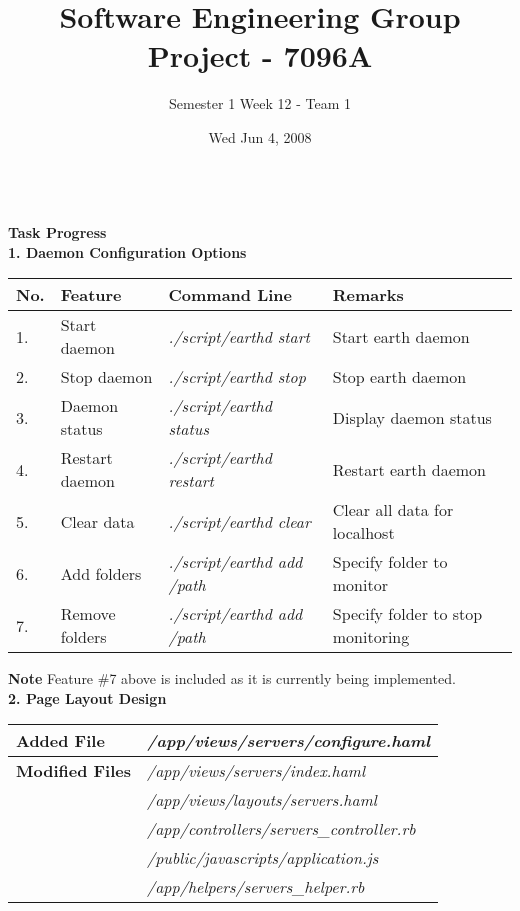 \documentclass[10pt, a4]{article}
\begin{document}
 
\title{Software Engineering Group Project - 7096A}
\author{Semester 1 Week 12 - Team 1}
\date{Wed Jun 4, 2008}

\maketitle 


\\

\noindent \textbf{\large Task Progress}\\

\noindent \textbf{\normalsize 1. Daemon Configuration Options}

\begin{table}[ht!]
\begin{tabular}{|p{0.5cm}|p{2.4cm}|p{3.5cm}|p{4.8cm}|} \hline
\textbf{No.} & \textbf{Feature} & \textbf{Command Line} & \textbf{Remarks} \\
\hline
1. & Start daemon & \emph{./script/earthd start} & Start earth daemon\\
\hline
2. & Stop daemon & \emph{./script/earthd stop} & Stop earth daemon\\
\hline
3. & Daemon status & \emph{./script/earthd status} & Display daemon status\\
\hline
4. & Restart daemon & \emph{./script/earthd restart} & Restart earth daemon\\
\hline
5. & Clear data & \emph{./script/earthd clear} & Clear all data for localhost\\
\hline
6. & Add folders & \emph{./script/earthd add /path} & Specify folder to monitor\\
\hline
7. & Remove folders & \emph{./script/earthd add /path} & Specify folder to stop monitoring\\
\hline
\end{tabular}
\end{table}


\noindent \textbf{\normalsize Note} Feature \#7 above is included as it is currently being implemented.\\

\noindent \textbf{\normalsize 2. Page Layout Design}

\begin{table}[ht!]
\begin{tabular}{|p{3cm}|p{8cm}|} \hline
\textbf{Added File} & \emph{/app/views/servers/configure.haml}\\
\hline
\textbf{Modified Files} & \emph{/app/views/servers/index.haml}\\
 & \emph{/app/views/layouts/servers.haml}\\
 & \emph{/app/controllers/servers\_controller.rb}\\
 & \emph{/public/javascripts/application.js}\\
 & \emph{/app/helpers/servers\_helper.rb}\\
\hline
\end{tabular}
\end{table}
\end{document}
